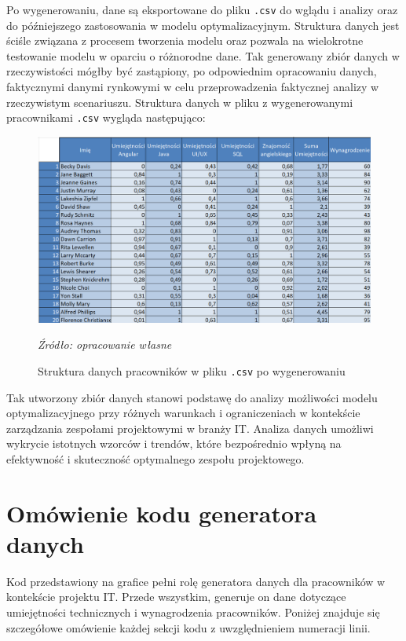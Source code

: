 \par Po wygenerowaniu, dane są eksportowane do pliku \verb|.csv| do wglądu i analizy oraz do późniejszego zastosowania w modelu optymalizacyjnym. Struktura danych jest ściśle związana z procesem tworzenia modelu oraz pozwala na wielokrotne testowanie modelu w oparciu o różnorodne dane. Tak generowany zbiór danych w rzeczywistości mógłby być zastąpiony, po odpowiednim opracowaniu danych, faktycznymi danymi rynkowymi w celu przeprowadzenia faktycznej analizy w rzeczywistym scenariuszu. Struktura danych w pliku z wygenerowanymi pracownikami \verb|.csv| wygląda następująco:
\begin{figure}[H]
    \centering
    \includegraphics[width=\linewidth]{chapters/Images/pracownicy_csv.png}
    \cprotect\caption{Struktura danych pracowników w pliku \verb|.csv| po wygenerowaniu}
    \textit{Źródło: opracowanie własne}
\end{figure}

\par Tak utworzony zbiór danych stanowi podstawę do analizy możliwości modelu optymalizacyjnego przy różnych warunkach i ograniczeniach w kontekście zarządzania zespołami projektowymi w branży IT. Analiza danych umożliwi wykrycie istotnych wzorców i trendów, które bezpośrednio wpłyną na efektywność i skuteczność optymalnego zespołu projektowego.



\section{Omówienie kodu generatora danych}\label{sec:kod_generator}
\par Kod przedstawiony na grafice pełni rolę generatora danych dla pracowników w kontekście projektu IT. Przede wszystkim, generuje on dane dotyczące umiejętności technicznych i wynagrodzenia pracowników. Poniżej znajduje się szczegółowe omówienie każdej sekcji kodu z uwzględnieniem numeracji linii.

